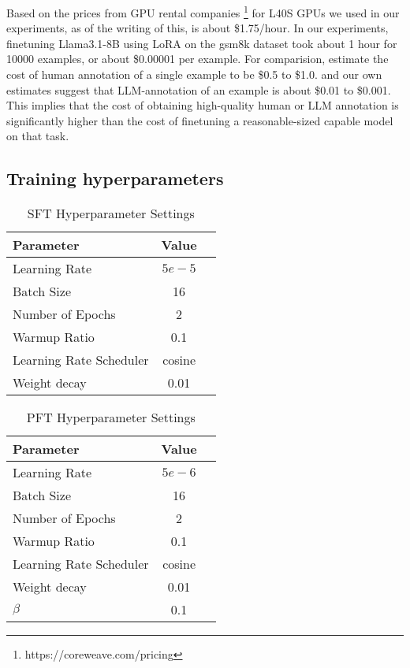\label{compute_costs}

Based on the prices from GPU rental companies \footnote{https://coreweave.com/pricing} for L40S GPUs we used in our experiments, as of the writing of this, is about \$1.75/hour. In our experiments, finetuning Llama3.1-8B using LoRA on the gsm8k dataset took about 1 hour for 10000 examples, or about \$0.00001 per example. For comparision, \citet{kiela-etal-2021-dynabench} estimate the cost of human annotation of a single example to be \$0.5 to \$1.0. \citet{honovich-etal-2023-unnatural} and our own estimates suggest that LLM-annotation of an example is about \$0.01 to \$0.001. This implies that the cost of obtaining high-quality human or LLM annotation is significantly higher than the cost of finetuning a reasonable-sized capable model on that task. 



\subsection{Training hyperparameters}

\label{hyperparameters}

\begin{table}[h]
\centering
\caption{SFT Hyperparameter Settings}
\begin{tabular}{lcc}
\toprule
Parameter & Value \\
\midrule
Learning Rate & $5e-5$ \\ %
Batch Size &  16 \\ %
Number of Epochs & 2 \\ %
Warmup Ratio & 0.1 \\ %
Learning Rate Scheduler & cosine \\ %
Weight decay & 0.01 \\
\bottomrule
\end{tabular}
\label{tab:sft_hyperparameters} %
\end{table}


\begin{table}[h]
\centering
\caption{PFT Hyperparameter Settings}
\begin{tabular}{lcc}
\toprule
Parameter & Value \\
\midrule
Learning Rate & $5e-6$ \\ %
Batch Size &  16 \\ %
Number of Epochs & 2 \\ %
Warmup Ratio & 0.1 \\ %
Learning Rate Scheduler & cosine \\ %
Weight decay & 0.01 \\
$\beta$ & 0.1 \\
\bottomrule
\end{tabular}
\label{tab:pft_hyperparameters} %
\end{table}


